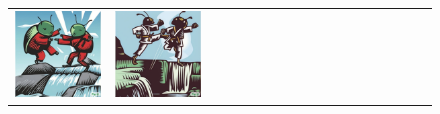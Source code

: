 \begin{figure}[ht!]
\begin{adjustwidth}{-0.8in}{-0.5in}
\begin{tabular}{cccccccccccccccccccc}
\multicolumn{2}{c}{\includegraphics[width=\threebythreecolwidth\textwidth]{figures/cherries/beetles_0.jpg}} &
\multicolumn{2}{c}{\includegraphics[width=\threebythreecolwidth\textwidth]{figures/cherries/beetles_1.jpg}} &

\end{tabular}
\end{adjustwidth}
\end{figure}
